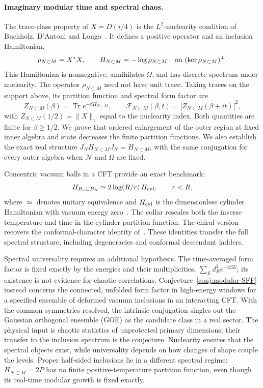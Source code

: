\documentclass[a4paper,11pt]{article}
\theoremstyle{definition}
\begin{document}
\paragraph{Imaginary modular time and spectral chaos.}
The trace-class property of $X=D(i/4)$ is the $L^2$-nuclearity condition of Buchholz, D'Antoni and Longo~\cite{BDL2007}. It defines a positive operator and an inclusion Hamiltonian,
\begin{equation}
 \rho_{N\subset M}=X^*X,
 \qquad
 H_{N\subset M}=-\log\rho_{N\subset M}
 \quad\hbox{on }(\ker\rho_{N\subset M})^\perp.
\end{equation}
This Hamiltonian is nonnegative, annihilates $\Omega$, and has discrete spectrum under nuclearity. The operator $\rho_{N\subset M}$ need not have unit trace. Taking traces on the support above, its partition function and spectral form factor are
\begin{equation}
 Z_{N\subset M}(\beta)=\operatorname{Tr}e^{-\beta H_{N\subset M}},
 \qquad
 \mathcal F_{N\subset M}(\beta,t)=|Z_{N\subset M}(\beta+it)|^2,
\end{equation}
with $Z_{N\subset M}(1/2)=\|X\|_1$ equal to the nuclearity index. Both quantities are finite for $\beta\ge1/2$. We prove that ordered enlargement of the outer region at fixed inner algebra and state decreases the finite partition functions. We also establish the exact real structure $J_NH_{N\subset M}J_N=H_{N\subset M}$, with the same conjugation for every outer algebra when $\mathcal N$ and $\Omega$ are fixed.

Concentric vacuum balls in a CFT provide an exact benchmark:
\begin{equation}
 H_{B_r\subset B_R}\simeq2\log(R/r)\,H_{\rm cyl},
 \qquad r<R,
\end{equation}
where $\simeq$ denotes unitary equivalence and $H_{\rm cyl}$ is the dimensionless cylinder Hamiltonian with vacuum energy zero~\cite{companionQFT}. The collar rescales both the inverse temperature and time in the cylinder partition function. The chiral version recovers the conformal-character identity of~\cite{BDL2007}. These identities transfer the full spectral structure, including degeneracies and conformal descendant ladders.

Spectral universality requires an additional hypothesis. The time-averaged form factor is fixed exactly by the energies and their multiplicities, $\sum_E d_E^2e^{-2\beta E}$; its existence is not evidence for chaotic correlations. Conjecture~\ref{conj:modular-SFF} instead concerns the connected, unfolded form factor in high-energy windows for a specified ensemble of deformed vacuum inclusions in an interacting CFT. With the common symmetries resolved, the intrinsic conjugation singles out the Gaussian orthogonal ensemble (GOE) as the candidate class in a real sector. The physical input is chaotic statistics of unprotected primary dimensions; their transfer to the inclusion spectrum is the conjecture. Nuclearity ensures that the spectral objects exist, while universality depends on how changes of shape couple the levels. Proper half-sided inclusions lie in a different spectral regime: $H_{N\subset M}=2P$ has no finite positive-temperature partition function, even though its real-time modular growth is fixed exactly.
\end{document}
